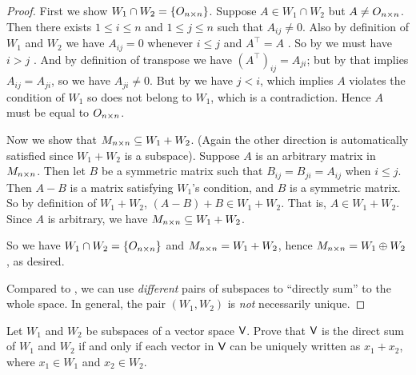 \begin{proof}
First we show \(W_1 \cap W_2 = \{ O_{n \times n} \}\).
Suppose \(A \in W_1 \cap W_2\) but \(A \ne O_{n \times n}\).
Then there exists \(1 \le i \le n\) and \(1 \le j \le n\) such that \(A_{ij} \ne 0\).
Also by definition of \(W_1\) and \(W_2\) we have \(A_{ij} = 0\) whenever \(i \le j\)  and \(A^\top = A\) .
So by  we must have \(i > j\) .
And by definition of transpose we have \((A^\top)_{ij} = A_{ji}\);
but by  that implies \(A_{ij} = A_{ji}\), so we have \(A_{ji} \ne 0\).
But by  we have \(j < i\), which implies \(A\) violates the condition of \(W_1\) so does not belong to \(W_1\), which is a contradiction.
Hence \(A\) must be equal to \(O_{n \times n}\).

Now we show that \(M_{n \times n} \subseteq W_1 + W_2\).
(Again the other direction is automatically satisfied since \(W_1 + W_2\) is a subspace).
Suppose \(A\) is an arbitrary matrix in \(M_{n \times n}\).
Then let \(B\) be a symmetric matrix such that \(B_{ij} = B_{ji} = A_{ij}\) when \(i \le j\).
Then \(A - B\) is a matrix satisfying \(W_1\)'s condition, and \(B\) is a symmetric matrix.
So by definition of \(W_1 + W_2\), \((A - B) + B \in W_1 + W_2\).
That is, \(A \in W_1 + W_2\).
Since \(A\) is arbitrary, we have \(M_{n \times n} \subseteq W_1 + W_2\).

So we have \(W_1 \cap W_2 = \{ O_{n \times n} \}\) and \(M_{n \times n} = W_1 + W_2\), hence \(M_{n \times n} = W_1 \oplus W_2\), as desired.

Compared to , we can use \emph{different} pairs of subspaces to ``directly sum'' to the whole space.
In general, the pair \((W_1, W_2)\) is \emph{not} necessarily unique.
\end{proof}

\begin{exercise} \label{exercise 1.3.30}
Let \(W_1\) and \(W_2\) be subspaces of a vector space \(\textsf{V}\).
Prove that \(\textsf{V}\) is the direct sum of \(W_1\) and \(W_2\) if and only if each vector in \(\textsf{V}\) can be uniquely written as \(x_1 + x_2\), where \(x_1 \in W_1\) and \(x_2 \in W_2\).
\end{exercise}

